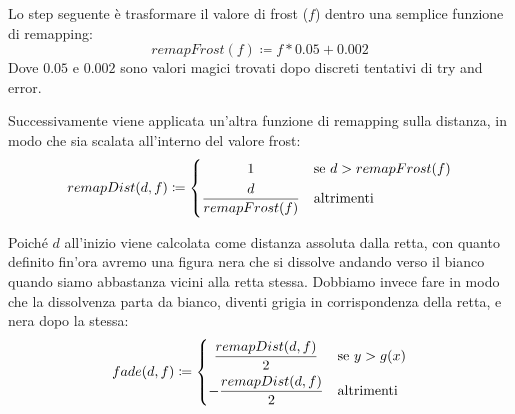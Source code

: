 \documentclass[main.tex]{subfiles}
\begin{document}
Lo step seguente è trasformare il valore di frost ($f$) dentro una semplice funzione di remapping:
\[remapFrost(f) \coloneqq f * 0.05 + 0.002\]
Dove $0.05$ e $0.002$ sono valori magici trovati dopo discreti tentativi di try and error.

Successivamente viene applicata un'altra funzione di remapping sulla distanza, in modo che sia scalata all'interno del valore frost:
\[remapDist(d, f) \coloneqq 
	\begin{dcases}
		\hfil 1 & \text{se } d > remapFrost(f)\\
		\frac{d}{remapFrost(f)} & \text{altrimenti}
	\end{dcases}
\]

Poiché $d$ all'inizio viene calcolata come distanza assoluta dalla retta, con quanto definito fin'ora avremo una figura nera che si dissolve andando verso il bianco quando siamo abbastanza vicini alla retta stessa. Dobbiamo invece fare in modo che la dissolvenza parta da bianco, diventi grigia in corrispondenza della retta, e nera dopo la stessa:
\[fade(d, f) \coloneqq 
	\begin{dcases}
		\hfil	 \frac{remapDist(d, f)}{2} & \text{se } y > g(x)\\
				-\frac{remapDist(d, f)}{2} & \text{altrimenti}
	\end{dcases}
\]
\newline
\end{document}
